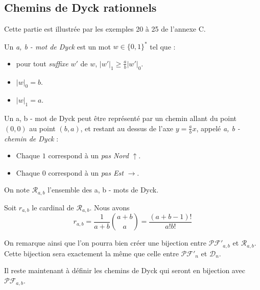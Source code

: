 \subsection{Chemins de Dyck rationnels}

Cette partie est illustrée par les exemples 20 à 25 de l'annexe C.

\begin{definition}
    Un \emph{a, b - mot de Dyck} est un mot $w \in \{0,1\}^*$ tel que :
    \begin{itemize}
        \item pour tout \emph{suffixe} $w'$ de $w$,
            $\displaystyle |w'|_1 \geqslant \frac{a}{b}|w'|_0$.
        \item $|w|_0 = b$.
        \item $|w|_1 = a$.
    \end{itemize}
\end{definition}

Un a, b - mot de Dyck peut être représenté par un chemin allant du point
$(0,0)$ au point $(b,a)$, et restant au dessus de l'axe $y = \frac{a}{b}x$,
appelé \emph{a, b - chemin de Dyck} :
\begin{itemize}
    \item Chaque $1$ correspond à un \emph{pas Nord} $\uparrow$. 
    \item Chaque $0$ correspond à un \emph{pas Est} $\rightarrow$.
\end{itemize}

On note $\mathcal{R}_{a, b}$ l'ensemble des a, b - mots de Dyck.

\begin{theorem}[Bizley, 1954]
    Soit $r_{a,b}$ le cardinal de $\mathcal{R}_{a,b}$.
    Nous avons $$r_{a,b} = \frac{1}{a+b} \binom {a+b}{a} =
    \frac{(a+b-1)!}{a!b!}$$
\end{theorem}

On remarque ainsi que l'on pourra bien créer une bijection entre
$\mathcal{PF'}_{a,b}$ et $\mathcal{R}_{a,b}$.
Cette bijection sera exactement la même que celle entre $\mathcal{PF'}_n$
et $\mathcal{D}_{n}$.

Il reste maintenant à définir les chemins de Dyck qui seront en bijection
avec $\mathcal{PF}_{a,b}$.

